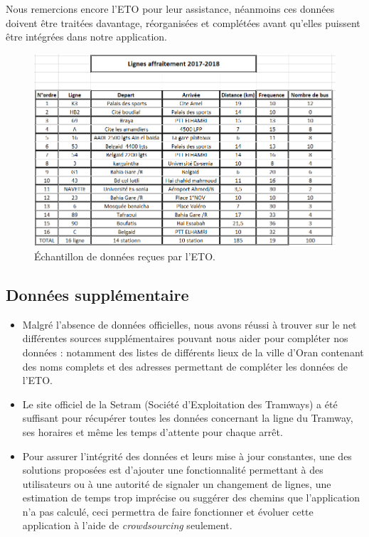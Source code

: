 Nous remercions encore l'ETO pour leur assistance, néanmoins ces données doivent être traitées davantage, réorganisées et complétées avant qu'elles puissent être intégrées dans notre application.

\begin{figure}
	\center
	\includegraphics[scale=0.7]{img/LignesETO.png}
	\caption{Échantillon de données reçues par l'ETO.}
\end{figure}

\subsection{Données supplémentaire}
	\begin{itemize}
		\item Malgré l'absence de données officielles, nous avons réussi à trouver sur le net différentes sources supplémentaires pouvant nous aider pour compléter nos données : notamment des listes de différents lieux de la ville d'Oran contenant des noms complets et des adresses permettant de compléter les données de l'ETO.
		\item Le site officiel de la Setram (Société d'Exploitation des Tramways) a été suffisant pour récupérer toutes les données concernant la ligne du Tramway, ses horaires et même les temps d'attente pour chaque arrêt.
		\item Pour assurer l'intégrité des données et leurs mise à jour constantes, une des solutions proposées est d'ajouter une fonctionnalité permettant à des utilisateurs ou à une autorité de signaler un changement de lignes, une estimation de temps trop imprécise ou suggérer des chemins que l'application n'a pas calculé, ceci permettra de faire fonctionner et évoluer cette application à l'aide de \emph{crowdsourcing} seulement.
	\end{itemize}

